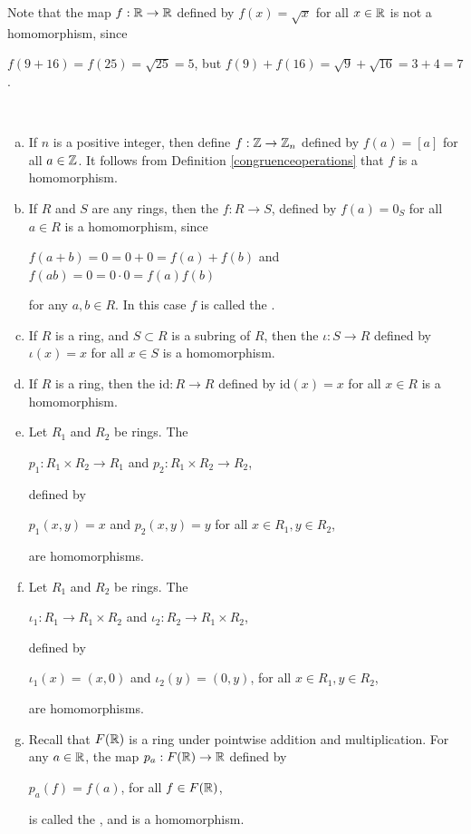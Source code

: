 \documentclass[11pt,fleqn,dvipsnames,usenames]{article}
\newcommand{\p}{\noindent}
\begin{document}
%
\p Note that the map $f:\mathbb{R}\to\mathbb{R}$ defined by $f(x) = \sqrt{x}$ for all $x\in\mathbb{R}$ is not a homomorphism, since
\begin{center}
$f(9 + 16) = f(25) = \sqrt{25} = 5$, but $f(9) + f(16) = \sqrt{9} + \sqrt{16} = 3 + 4 = 7$.
\end{center}
%
\begin{examples}\label{homomorphismexamples}~
\begin{enumerate}[(a)]
\item If $n$ is a positive integer, then define $f:\mathbb{Z}\to\mathbb{Z}_{n}$ defined by $f(a) = [a]$ for all $a\in\mathbb{Z}$.  It follows from Definition \ref{congruenceoperations} that $f$ is a homomorphism.
\item If $R$ and $S$ are any rings, then the  $f:R\to S$, defined by $f(a) = 0_{S}$ for all $a\in R$ is a homomorphism, since
\begin{center}
$f(a + b) = 0 = 0 + 0 = f(a) + f(b)$ and $f(ab) = 0 = 0\cdot 0 = f(a)f(b)$
\end{center}
for any $a,b\in R$.  In this case $f$ is called the .
\item If $R$ is a ring, and $S\subset R$ is a subring of $R$, then the  $\iota:S\to R$ defined by $\iota(x) = x$ for all $x\in S$ is a homomorphism.
\item If $R$ is a ring, then the  $\text{id}:R\to R$ defined by $\text{id}(x) = x$ for all $x\in R$ is a homomorphism.
\item Let $R_1$ and $R_2$ be rings.  The 
\begin{center}
$p_{1}:R_1\times R_2\to R_1$ and $p_2:R_1\times R_2\to R_2$,
\end{center}
defined by
\begin{center}
$p_1(x,y) = x$ and $p_2(x,y) = y$ for all $x\in R_1,y\in R_2$,
\end{center}
are homomorphisms.
\item Let $R_1$ and $R_2$ be rings.  The 
\begin{center}
$\iota_1:R_1\to R_1\times R_2$ and $\iota_2:R_2\to R_1\times R_2$,
\end{center}
defined by
\begin{center}
$\iota_1(x) = (x,0)$ and $\iota_2(y) = (0,y)$, for all $x\in R_1,y\in R_2$,
\end{center}
are homomorphisms.
\item Recall that $F(\mathbb{R})$ is a ring under pointwise addition and multiplication.  For any $a\in \mathbb{R}$, the map $p_{a}:F(\mathbb{R})\to \mathbb{R}$ defined by
\begin{center}
$p_a(f) = f(a)$, for all $f\in F(\mathbb{R})$,
\end{center}
is called the , and is a homomorphism.
\end{enumerate}
\end{examples}
\end{document}
